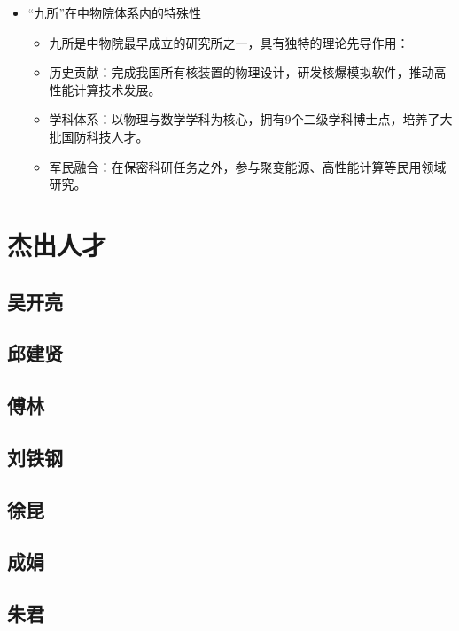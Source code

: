 \documentclass{book}
\begin{document}
\begin{itemize}
\begin{itemize}
        \item ​研究领域：多学科交叉，聚焦理论物理、计算数学、等离子体物理、激光物理等，承担核武器物理设计、高性能计算软件开发等任务。设有物理学与数学博士后流动站，主导《计算物理》等学术期刊。
        \item ​职能定位：以国家重大需求为牵引，在禁核试条件下保障核威慑有效性，同时拓展聚变能源、先进常规武器等方向。
    \end{itemize}
    \item “九所”在中物院体系内的特殊性
    \begin{itemize}
        \item 九所是中物院最早成立的研究所之一，具有独特的理论先导作用：
        \item ​历史贡献：完成我国所有核装置的物理设计，研发核爆模拟软件，推动高性能计算技术发展。
        \item ​学科体系：以物理与数学学科为核心，拥有9个二级学科博士点，培养了大批国防科技人才。
        \item ​军民融合：在保密科研任务之外，参与聚变能源、高性能计算等民用领域研究。
    \end{itemize}
\end{itemize}
\section{杰出人才}
\subsection{吴开亮}
\subsection{邱建贤}
\subsection{傅林}
\subsection{刘铁钢}
\subsection{徐昆}
\subsection{成娟}
\subsection{朱君}
\end{document}
